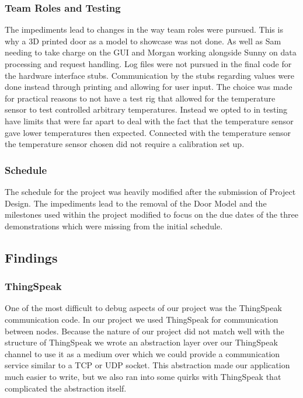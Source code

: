 \subsubsection{Team Roles and Testing}

 The impediments lead to changes in the way team roles were pursued. This is why a 3D printed door as a model to showcase was not done. As well as Sam needing to take charge on the GUI and Morgan working alongside Sunny on data processing and request handling. Log files were not pursued in the final code for the hardware interface stubs. Communication by the stubs regarding values were done instead through printing and allowing for user input. The choice was made for practical reasons to not have a test rig that allowed for the temperature sensor to test controlled arbitrary temperatures. Instead we opted to in testing have limits that were far apart to deal with the fact that the temperature sensor gave lower temperatures then expected. Connected with the temperature sensor the temperature sensor chosen did not require a calibration set up.
\subsubsection{Schedule}

The schedule for the project was heavily modified after the submission of Project Design. The impediments lead to the removal of the Door Model and the milestones used within the project modified to focus on the due dates of the three demonstrations which were missing from the initial schedule.

\subsection{Findings}


\subsubsection{ThingSpeak}

One of the most difficult to debug aspects of our project was the ThingSpeak
communication code. In our project we used ThingSpeak for communication between
nodes. Because the nature of our project did not match well with the structure
of ThingSpeak we wrote an abstraction layer over our ThingSpeak channel to
use it as a medium over which we could provide a communication service similar
to a TCP or UDP socket. This abstraction made our application much easier to
write, but we also ran into some quirks with ThingSpeak that complicated the
abstraction itself.

